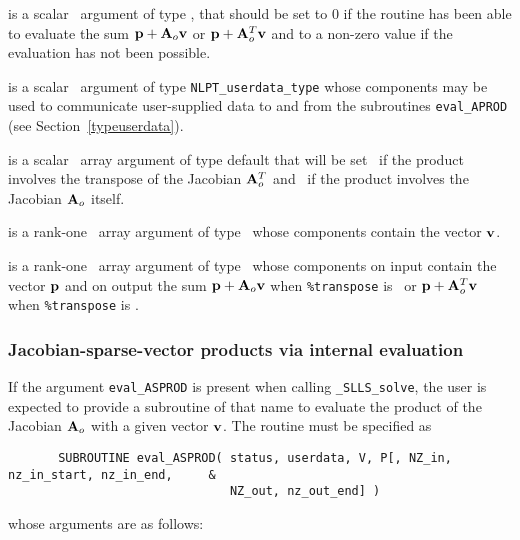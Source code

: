 \documentclass{galahad}
\newcommand{\packagename}{SLLS}
\newcommand{\fullpackagename}{\libraryname\_\packagename}
\newcommand{\solver}{{\tt \fullpackagename\_solve}}
\begin{document}
\begin{description}
 is a scalar \intentout\ argument of type \integer,
that should be set to 0 if the routine has been able to evaluate the
sum ${\mathbf{p}} + {\mathbf{A}}_o {\mathbf{v}}$ or ${\mathbf{p}} + {\mathbf{A}}_o^T{\mathbf{v}}$
and to a non-zero value if the evaluation has not been possible.

 is a scalar \intentinout\ argument of type
{\tt NLPT\_userdata\_type} whose components may be used
to communicate user-supplied data to and from the subroutines
{\tt eval\_APROD}
(see Section~\ref{typeuserdata}).

 is a scalar \intentin\ array argument of type
default that will be set \true\ if the product involves the transpose
of the Jacobian ${\mathbf{A}}_o^T$ and \false\ if the product involves
the Jacobian ${\mathbf{A}}_o$ itself.

 is a rank-one \intentin\ array argument of type \realdp\
whose components contain the vector ${\mathbf{v}}$.

 is a rank-one \intentinout\ array argument of type \realdp\
whose components on input contain the vector ${\mathbf{p}}$ and on output the
sum ${\mathbf{p}} + {\mathbf{A}}_o {\mathbf{v}}$ when {\tt \%transpose} is \false\ or
${\mathbf{p}} + {\mathbf{A}}_o^T {\mathbf{v}}$ when {\tt \%transpose} is \true.

\end{description}



\subsubsection{Jacobian-sparse-vector products via internal evaluation\label{jvps}}

If the argument {\tt eval\_ASPROD} is present when calling \solver, the
user is expected to provide a subroutine of that name to evaluate the
product of the Jacobian ${\mathbf{A}}_o$ with a given vector ${\mathbf{v}}$.
The routine must be specified as

\def\baselinestretch{0.8}
{\tt \begin{verbatim}
       SUBROUTINE eval_ASPROD( status, userdata, V, P[, NZ_in, nz_in_start, nz_in_end,     &
                               NZ_out, nz_out_end] )
\end{verbatim} }
\def\baselinestretch{1.0}
\noindent whose arguments are as follows:
\end{document}
